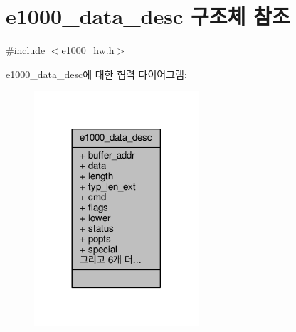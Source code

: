 \hypertarget{structe1000__data__desc}{}\section{e1000\+\_\+data\+\_\+desc 구조체 참조}
\label{structe1000__data__desc}


{\ttfamily \#include $<$e1000\+\_\+hw.\+h$>$}



e1000\+\_\+data\+\_\+desc에 대한 협력 다이어그램\+:
\nopagebreak
\begin{figure}[H]
\begin{center}
\leavevmode
\includegraphics[width=173pt]{structe1000__data__desc__coll__graph}
\end{center}
\end{figure}
